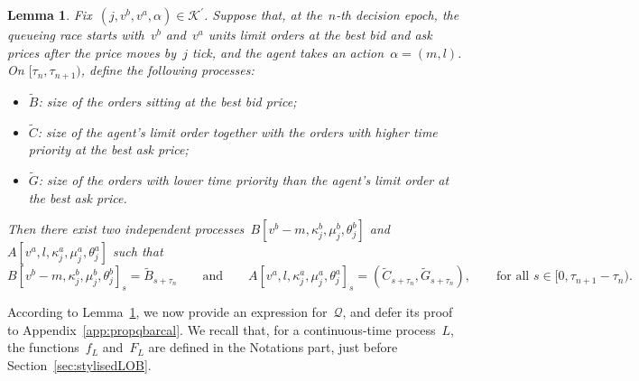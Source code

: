 \documentclass{amsart}[11pt]
\numberwithin{equation}{section}
\newtheorem{lemma}[theorem]{Lemma}
\theoremstyle{definition}
\newcommand{\Kk}{\mathcal{K}}
\newcommand{\Qq}{\mathcal{Q}}
\begin{document}
\begin{lemma}\label{Lem:SMK&BDP}\cite[Lemma~2]{cont2010stochastic}
Fix~$\left(j, v^b, v^a, \alpha\right)\in \Kk^\prime$.
Suppose that, at the~$n$-th decision epoch, 
the queueing race starts with~$v^b$ and~$v^a$ units limit orders at the best bid and ask prices 
after the price moves by~$j$ tick, and the agent takes an action~$\alpha = (m, l)$.
On $[\tau_n, \tau_{n+1})$, define the following processes:
\begin{itemize}
\item $\widetilde{B}$: size of the orders sitting at the best bid price;
\item $\widetilde{C}$: size of the agent's limit order together with the orders with higher time priority at the best ask price;
\item $\widetilde{G}$: size of the orders with lower time priority than the agent's limit order at the best ask price.
\end{itemize}

Then there exist two independent processes~$B[{v}^b-{m}, \kappa_{{j}}^b, \mu_{{j}}^b, \theta_{{j}}^b]$
and~$A[{v}^a, {l}, \kappa_{{j}}^a, \mu_{{j}}^a, \theta_{{j}}^a]$
such that
$$
B[{v}^b-{m}, \kappa_{{j}}^b, \mu_{{j}}^b, \theta_{{j}}^b]_s = \widetilde{B}_{s+\tau_n}
\qquad\text{and}\qquad
A[{v}^a, {l}, \kappa_{{j}}^a, \mu_{{j}}^a, \theta_{{j}}^a]_s = (\widetilde{C}_{s+\tau_n}, \widetilde{G}_{s+\tau_n}),
\qquad\text{for all }s\in[0, \tau_{n+1} - \tau_n).
$$
\end{lemma}
According to Lemma~\ref{Lem:SMK&BDP}, we now provide an expression for~${\Qq}$, 
and defer its proof to Appendix~\ref{app:propqbarcal}.
We recall that, for a continuous-time process~$L$, 
the functions~$f_L$ and~$F_L$ are defined in the Notations part, just before Section~\ref{sec:stylisedLOB}.
\end{document}
